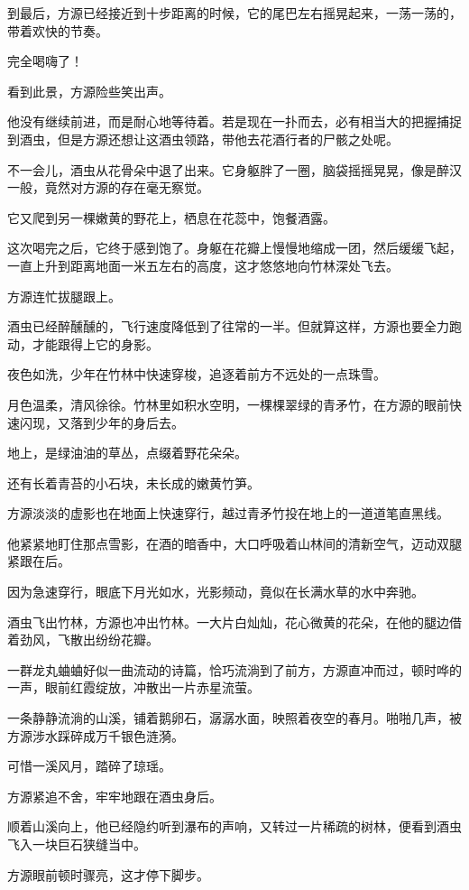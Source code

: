 \begin{this_body}
到最后，方源已经接近到十步距离的时候，它的尾巴左右摇晃起来，一荡一荡的，带着欢快的节奏。

完全喝嗨了！

看到此景，方源险些笑出声。

他没有继续前进，而是耐心地等待着。若是现在一扑而去，必有相当大的把握捕捉到酒虫，但是方源还想让这酒虫领路，带他去花酒行者的尸骸之处呢。

不一会儿，酒虫从花骨朵中退了出来。它身躯胖了一圈，脑袋摇摇晃晃，像是醉汉一般，竟然对方源的存在毫无察觉。

它又爬到另一棵嫩黄的野花上，栖息在花蕊中，饱餐酒露。

这次喝完之后，它终于感到饱了。身躯在花瓣上慢慢地缩成一团，然后缓缓飞起，一直上升到距离地面一米五左右的高度，这才悠悠地向竹林深处飞去。

方源连忙拔腿跟上。

酒虫已经醉醺醺的，飞行速度降低到了往常的一半。但就算这样，方源也要全力跑动，才能跟得上它的身影。

夜色如洗，少年在竹林中快速穿梭，追逐着前方不远处的一点珠雪。

月色温柔，清风徐徐。竹林里如积水空明，一棵棵翠绿的青矛竹，在方源的眼前快速闪现，又落到少年的身后去。

地上，是绿油油的草丛，点缀着野花朵朵。

还有长着青苔的小石块，未长成的嫩黄竹笋。

方源淡淡的虚影也在地面上快速穿行，越过青矛竹投在地上的一道道笔直黑线。

他紧紧地盯住那点雪影，在酒的暗香中，大口呼吸着山林间的清新空气，迈动双腿紧跟在后。

因为急速穿行，眼底下月光如水，光影频动，竟似在长满水草的水中奔驰。

酒虫飞出竹林，方源也冲出竹林。一大片白灿灿，花心微黄的花朵，在他的腿边借着劲风，飞散出纷纷花瓣。

一群龙丸蛐蛐好似一曲流动的诗篇，恰巧流淌到了前方，方源直冲而过，顿时哗的一声，眼前红霞绽放，冲散出一片赤星流萤。

一条静静流淌的山溪，铺着鹅卵石，潺潺水面，映照着夜空的春月。啪啪几声，被方源涉水踩碎成万千银色涟漪。

可惜一溪风月，踏碎了琼瑶。

方源紧追不舍，牢牢地跟在酒虫身后。

顺着山溪向上，他已经隐约听到瀑布的声响，又转过一片稀疏的树林，便看到酒虫飞入一块巨石狭缝当中。

方源眼前顿时骤亮，这才停下脚步。


\end{this_body}
